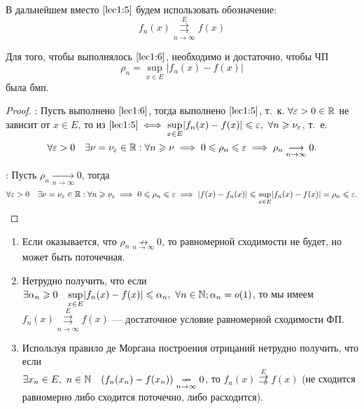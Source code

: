 \documentclass[../../main.tex]{subfiles}
\begin{document}
В дальнейшем вместо $\eqref{lec1:5}$ будем использовать обозначение:
\begin{equation}
\label{lec1:6}
f_n(x) \overset{E}{\underset{n \to \infty}\rightrightarrows} f(x)
\end{equation}
\begin{thm} 
Для того, чтобы выполнялось $\eqref{lec1:6}$, необходимо и достаточно, чтобы
ЧП \begin{equation}
\label{lec1:7}
\rho_n = \underset{x \in E}{\sup}|f_n(x) - f(x)| 
\end{equation} была бмп.
\end{thm}
\begin{proof}
 \;

 \nec: Пусть выполнено $\eqref{lec1:6}$, тогда выполнено $\eqref{lec1:5}$,
 т.~к. $\forall \varepsilon > 0 \in \mathbb{R}$ не зависит от $x \in E$, 
 то из $\eqref{lec1:5} \iff 
 \underset{x \in E}{\sup}|f_n(x) - f(x)| \leq \eps,\ 
 \forall n \geq \nu_\eps$, т.~е.
 \[\forall \varepsilon > 0 \quad \exists \nu = \nu_\varepsilon \in \mathbb{R} : 
 \forall n \geqslant \nu \implies 
 0 \leqslant \rho_n \leqslant \varepsilon \implies 
 \rho_n \underset{n \to \infty}{\longrightarrow}0.\]

 \suff: Пусть $\rho_n \underset{n \to \infty}{\longrightarrow}0$, тогда
\[\forall \varepsilon > 0 \quad \exists \nu = \nu_\varepsilon \in \mathbb{R} :
\forall n \geqslant \nu_\varepsilon \implies  
0 \leqslant \rho_n \leqslant \varepsilon \implies |f(x)-f_n(x)| \leqslant 
\underset{x \in E}{\sup}|f_n(x) - f(x)|
= \rho_n \leqslant \varepsilon. \qedhere\]
\end{proof}

\begin{rem}
	\;
	
 \begin{enumerate}
		\item Если оказывается, что 
$\rho_n \underset{n \to \infty}{\not \rightarrow}0$, 
то равномерной сходимости не будет, но может быть поточечная.

		\item Нетрудно получить, что если $\exists \alpha_n \geqslant 0 \quad 
\underset{x \in E}{\sup}|f_n(x) - f(x)| \leqslant \alpha_n,\ \forall n \in \mathbb{N};
\alpha_n = o(1)$, то мы имеем
$f_n(x) \overset{E}{\underset{n \to \infty}\rightrightarrows} f(x)$ ---
достаточное условие равномерной сходимости ФП.

		\item Используя правило де Моргана 
построения отрицаний нетрудно получить,
что если \\ $\exists x_n \in E,\ n \in \mathbb{N} \quad (f_n(x_n) - f(x_n))
\underset{n \to \infty}{\nrightarrow}0$, то 
$f_n(x) \overset{E}{\not \rightrightarrows} f(x)$ (не сходится 
равномерно либо сходится поточечно, либо расходится).
 \end{enumerate}	
\end{rem}	
\end{document}
